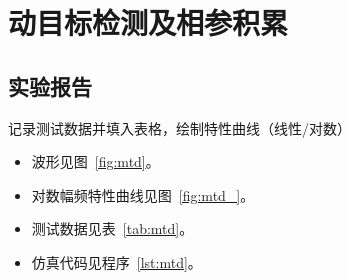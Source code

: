 \documentclass[../main]{subfiles}
\begin{document}
\chapter{动目标检测及相参积累}%
\label{cha:mtd}

\section{实验报告}%
\label{sec:\arabic{chapter}report}

记录测试数据并填入表格，绘制特性曲线（线性/对数）

\begin{Answer}
  \begin{itemize}
    \item 波形见图~\ref{fig:mtd}。
    \item 对数幅频特性曲线见图~\ref{fig:mtd_}。
    \item 测试数据见表~\ref{tab:mtd}。
    \item 仿真代码见程序~\ref{lst:mtd}。
  \end{itemize}
\end{Answer}
\end{document}
